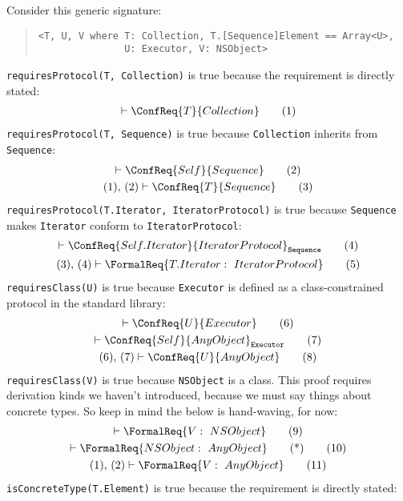 \documentclass[../generics]{subfiles}
\begin{document}
\begin{example}
Consider this generic signature:
\begin{quote}
\begin{verbatim}
<T, U, V where T: Collection, T.[Sequence]Element == Array<U>,
               U: Executor, V: NSObject>
\end{verbatim}
\end{quote}
\texttt{requiresProtocol(T, Collection)} is true because the requirement is directly stated:
\begin{gather}
\vdash\ConfReq{T}{Collection}\tag{1}
\end{gather}
\texttt{requiresProtocol(T, Sequence)} is true because \texttt{Collection} inherits from \texttt{Sequence}:
\begin{gather*}
\vdash \ConfReq{Self}{Sequence}\tag{2}\\
(1),\,(2)\vdash \ConfReq{T}{Sequence}\tag{3}
\end{gather*}
\texttt{requiresProtocol(T.Iterator, IteratorProtocol)} is true because \texttt{Sequence} makes \texttt{Iterator} conform to \texttt{IteratorProtocol}:
\begin{gather}
\vdash \ConfReq{Self.Iterator}{IteratorProtocol}_\texttt{Sequence}\tag{4}\\
(3),\,(4)\vdash \FormalReq{T.Iterator:~IteratorProtocol}\tag{5}
\end{gather}
\texttt{requiresClass(U)} is true because \texttt{Executor} is defined as a class-constrained protocol in the standard library:
\begin{gather}
\vdash \ConfReq{U}{Executor}\tag{6}\\
\vdash \ConfReq{Self}{AnyObject}_\texttt{Executor}\tag{7}\\
(6),\,(7)\vdash \ConfReq{U}{AnyObject}\tag{8}
\end{gather}
\texttt{requiresClass(V)} is true because \texttt{NSObject} is a class. This proof requires derivation kinds we haven't introduced, because we must say things about concrete types. So keep in mind the below is hand-waving, for now:
\begin{gather}
\vdash\FormalReq{V:~NSObject}\tag{9}\\
\vdash\FormalReq{NSObject:~AnyObject}\qquad\mbox{(*)}\tag{10}\\
(1),\,(2)\vdash\FormalReq{V:~AnyObject}\tag{11}
\end{gather}
\texttt{isConcreteType(T.Element)} is true because the requirement is directly stated:
\begin{gather}

\end{gather}
\end{example}
\end{document}
